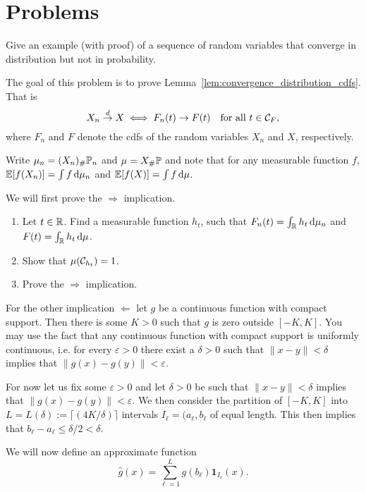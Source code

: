 \section{Problems}

\begin{problem}\label{prb:dlim_not_plim}
Give an example (with proof) of a sequence of random variables that converge in distribution but not in probability.
\end{problem}



\begin{problem}\label{prb:convergence_distribution}
The goal of this problem is to prove Lemma~\ref{lem:convergence_distribution_cdfs}. That is
\[
	X_n \stackrel{d}{\rightarrow} X \iff F_n(t) \to F(t) \quad \text{for all } t \in \mathcal C_F,
\]
where $F_n$ and $F$ denote the cdfs of the random variables $X_n$ and $X$, respectively.

Write $\mu_n = (X_n)_\# \mathbb P_n$ and $\mu = X_\# \mathbb P$ and note that for any measurable function $f$, $\mathbb E[f(X_n)] = \int f \, \mathrm{d} \mu_n$ and $\mathbb E[f(X)] = \int f \, \mathrm{d} \mu$.

We will first prove the $\Rightarrow$ implication. 
\begin{enumerate}[label={(\alph*)}]
\item Let $t \in \mathbb R$. Find a measurable function $h_t$, such that $F_n(t) = \int_{\mathbb R} h_t \, \mathrm{d} \mu_n$ and $F(t) = \int_{\mathbb R} h_t \, \mathrm{d} \mu$.
\item Show that $\mu(\mathcal C_{h_t}) = 1$.
\item Prove the $\Rightarrow$ implication. 
\end{enumerate}

For the other implication $\Leftarrow$ let $g$ be a continuous function with compact support. Then there is some $K > 0$ such that $g$ is zero outside $[-K,K]$. You may use the fact that any continuous function with compact support is uniformly continuous, i.e. for every $\varepsilon > 0$ there exist a $\delta > 0$ such that $\|x-y\| < \delta$ implies that $\|g(x) - g(y)\| < \varepsilon$. 

For now let us fix some $\varepsilon > 0$ and let $\delta > 0$ be such that $\|x-y\| < \delta$ implies that $\|g(x) - g(y)\| < \varepsilon$. We then consider the partition of $[-K,K]$ into $L = L(\delta) := \lceil (4K/\delta) \rceil$ intervals $I_\ell = (a_\ell, b_\ell$ of equal length. This then implies that $b_\ell - a_\ell \le \delta/2 < \delta$.

We will now define an approximate function
\[
	\hat{g}(x) = \sum_{\ell = 1}^L g(b_\ell) \mathbf{1}_{I_\ell}(x).
\]
 

\end{problem}
